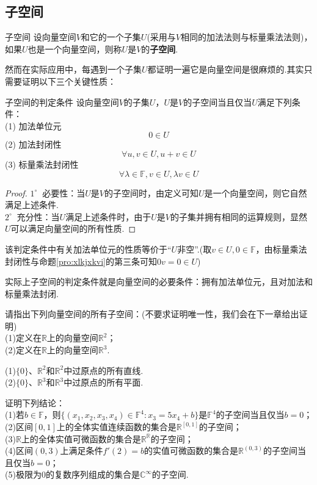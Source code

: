 \documentclass[lang=cn, zihao=5]{elegantbook}
\newcommand{\R}{\mathbb{R}}
\newcommand{\C}{\mathbb{C}}
\newcommand{\F}{\mathbb{F}}
\newcommand{\buzhou}[1]{$#1^{\circ} \ $}
\begin{document}
\subsection{子空间}

\begin{definition}{子空间}
    设向量空间$V$和它的一个子集$U$(采用与$V$相同的加法法则与标量乘法法则)，如果$U$也是一个向量空间，则称$U$是$V$的\textbf{子空间}.
\end{definition}

然而在实际应用中，每遇到一个子集$U$都证明一遍它是向量空间是很麻烦的.其实只需要证明以下三个关键性质：

\begin{proposition}{子空间的判定条件}
    设向量空间$V$的子集$U$，$U$是$V$的子空间当且仅当$U$满足下列条件： \\
    (1) 加法单位元$$0 \in U$$
    (2) 加法封闭性$$\forall u,v \in U, u+v \in U$$
    (3) 标量乘法封闭性$$\forall \lambda \in \F,v \in U,\lambda v \in U$$
\end{proposition}
\begin{proof}
    \buzhou{1} 必要性：当$U$是$V$的子空间时，由定义可知$U$是一个向量空间，则它自然满足上述条件. \\
    \buzhou{2} 充分性：当$U$满足上述条件时，由于$U$是$V$的子集并拥有相同的运算规则，显然$U$可以满足向量空间的所有性质.
\end{proof}
\begin{remark}
    该判定条件中有关加法单位元的性质等价于“$U$非空”.(取$v \in U,0 \in \F$，由标量乘法封闭性与命题\ref{pro:xlkjxkvi}的第三条可知$0v=0 \in U$)
\end{remark}
\begin{remark}
    实际上子空间的判定条件就是向量空间的必要条件：拥有加法单位元，且对加法和标量乘法封闭.
\end{remark}

\begin{example}
    请指出下列向量空间的所有子空间：(不要求证明唯一性，我们会在下一章给出证明) \\
    (1)定义在$\R$上的向量空间$\R ^{2}$； \\
    (2)定义在$\R$上的向量空间$\R ^{3}$.
\end{example}
\begin{solution}
    (1)$\{ 0 \}$、$\R ^2$和$\R ^2$中过原点的所有直线. \\
    (2)$\{ 0 \}$、$\R ^3$和$\R ^3$中过原点的所有平面. 
\end{solution}

\begin{example}
    证明下列结论：\\
    (1)若$b \in \F$，则$\{ (x_1,x_2,x_3,x_4) \in \F ^{4} : x_3 = 5x_4+b \}$是$\F ^{4}$的子空间当且仅当$b=0$； \\
    (2)区间$[0,1]$上的全体实值连续函数的集合是$\R ^{[0,1]}$的子空间； \\
    (3)$\R$上的全体实值可微函数的集合是$\R ^{\R}$的子空间； \\
    (4)区间$(0,3)$上满足条件$f'(2)=b$的实值可微函数的集合是$\R ^{(0,3)}$的子空间当且仅当$b=0$； \\
    (5)极限为$0$的复数序列组成的集合是$\C ^{\infty}$的子空间.
\end{example}
\end{document}
